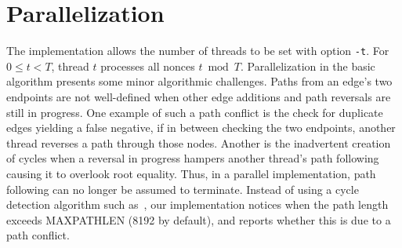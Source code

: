 \documentclass[11pt, oneside]{article}
\begin{document}

\section{Parallelization}
The implementation allows the number of threads to be set with option {\tt -t}.
For $0\leq t < T$, thread $t$ processes all nonces $t \bmod T$.
Parallelization in the basic algorithm presents some minor algorithmic challenges.
Paths from an edge's two endpoints
are not well-defined when other edge additions and path reversals are still in progress.
One example of such a path conflict is the check for duplicate edges yielding a false negative,
if in between checking the two endpoints, another thread reverses a path through those nodes.
Another is the inadvertent creation of cycles when a reversal in progress hampers another thread's
path following causing it to overlook root equality.
Thus, in a parallel implementation, path following can no longer be assumed to terminate.
Instead of using a cycle detection algorithm such as~\cite{1980-brent-cycles}, our implementation
notices when the path length exceeds MAXPATHLEN (8192 by default),
and reports whether this is due to a path conflict.
\end{document}
